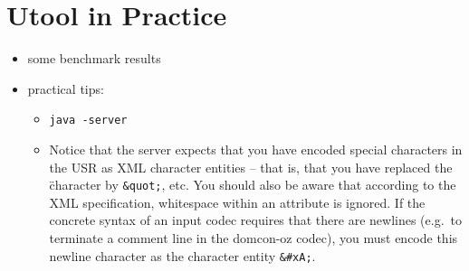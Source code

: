 
\section{Utool in Practice} \label{sec:practice}

\begin{itemize}
\item some benchmark results
\item practical tips:
\begin{itemize}
\item \verb?java -server?
\item Notice that the server expects that you have encoded special
characters in the USR as XML character entities -- that is, that you
have replaced the \" character by \verb?&quot;?, etc. You should also
be aware that according to the XML specification, whitespace within an attribute is ignored. If the concrete syntax of an input codec requires that there are newlines (e.g.\ to terminate a comment line in the domcon-oz codec), you must encode this newline character as the character entity \verb?&#xA;?.

\end{itemize}
\end{itemize}




